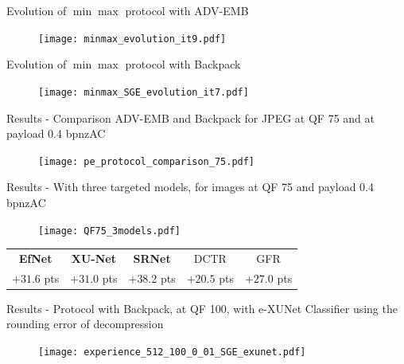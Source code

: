 \documentclass[10pt,aspectratio=169]{beamer}
\begin{document}
\begin{frame}{Evolution of $\min\max$ protocol with ADV-EMB}
    \begin{figure}
        \texttt{[image: minmax\_evolution\_it9.pdf]}
    \end{figure}
\end{frame}


\begin{frame}{Evolution of $\min\max$ protocol with Backpack}
    \begin{figure}
        \texttt{[image: minmax\_SGE\_evolution\_it7.pdf]}
    \end{figure}
\end{frame}



\begin{frame}{Results - Comparison ADV-EMB and Backpack for JPEG at QF 75 and at payload 0.4 bpnzAC}
    \begin{figure}[h]
        \texttt{[image: pe\_protocol\_comparison\_75.pdf]}
    \end{figure}
\end{frame}


\begin{frame}{Results - With three targeted models, for images at QF 75 and payload 0.4 bpnzAC}

    \begin{figure}[h]
        \texttt{[image: QF75\_3models.pdf]}
    \end{figure}
    \pause
    \begin{center}
        \begin{tabular}{ccccc}
           \textbf{EfNet} & \textbf{XU-Net} & \textbf{SRNet} & DCTR & GFR \\
           \alert{$+31.6 $ pts} & \alert{$+31.0$ pts} & \alert{$+38.2 $ pts} & $+20.5$ pts & $+27.0 $ pts
        \end{tabular}
    \end{center}
    
\end{frame}


\begin{frame}{Results - Protocol with Backpack, at QF 100, with e-XUNet}
Classifier using the rounding error of decompression~
    \begin{figure}[h]
        \texttt{[image: experience\_512\_100\_0\_01\_SGE\_exunet.pdf]}
    \end{figure}
\end{frame}
\end{document}
